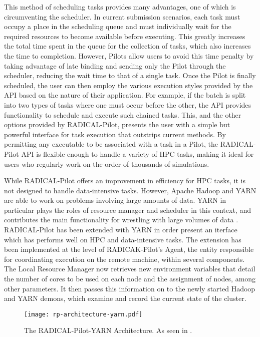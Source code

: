 \documentclass[]{article}
\begin{document}
	This method of scheduling tasks provides many advantages, one of which is circumventing the scheduler. In current submission scenarios, each task must occupy a place in the scheduling queue and must individually wait for the required resources to become available before executing. This greatly increases the total time spent in the queue for the collection of tasks, which also increases the time to completion. However, Pilots allow users to avoid this time penalty by taking advantage of late binding and sending only the Pilot through the scheduler, reducing the wait time to that of a single task. Once the Pilot is finally scheduled, the user can then employ the various execution styles provided by the API based on the nature of their application. For example, if the batch is split into two types of tasks where one must occur before the other, the API provides functionality to schedule and execute such chained tasks. This, and the other options provided by RADICAL-Pilot, presents the user with a simple but powerful interface for task execution that outstrips current methods. By permitting any executable to be associated with a task in a Pilot, the RADICAL-Pilot API is flexible enough to handle a variety of HPC tasks, making it ideal for users who regularly work on the order of thousands of simulations.

	While RADICAL-Pilot offers an improvement in efficiency for HPC tasks, it is not designed to handle data-intensive tasks. However, Apache Hadoop and YARN are able to work on problems involving large amounts of data. YARN in particular plays the roles of resource manager and scheduler in this context, and contributes the main functionality for wrestling with large volumes of data \cite{apache_hadoop_yarn}. RADICAL-Pilot has been extended with YARN in order present an iterface which has performs well on HPC and data-intensive tasks. The extension has been implemented at the level of RADICAK-Pilot's Agent, the entity responsible for coordinating execution on the remote machine, within several components. The Local Resource Manager now retrieves new environment variables that detail the number of cores to be used on each node and the assignment of nodes, among other parameters. It then passes this information on to the newly started Hadoop and YARN demons, which examine and record the current state of the cluster.

	\begin{figure}[H]
		\centering
		\texttt{[image: rp-architecture-yarn.pdf]}
		\caption{The RADICAL-Pilot-YARN Architecture. As seen in \cite{hadoop_paper}.}
		\label{fig:rp_yarn_arch}
	\end{figure}
\end{document}
